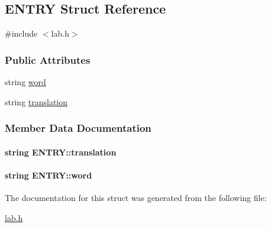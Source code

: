 \hypertarget{structENTRY}{\subsection{E\+N\+T\+R\+Y Struct Reference}
\label{structENTRY}
}


{\ttfamily \#include $<$lab.\+h$>$}

\subsubsection*{Public Attributes}
\begin{DoxyCompactItemize}
\item 
string \hyperlink{structENTRY_a7dfcf0a0b27dc7cecf80565a615d6233}{word}
\item 
string \hyperlink{structENTRY_aeffa74a793268864bbbdf6a3645bf36a}{translation}
\end{DoxyCompactItemize}


\subsubsection{Member Data Documentation}
\hypertarget{structENTRY_aeffa74a793268864bbbdf6a3645bf36a}{
\paragraph[{translation}]{\setlength{\rightskip}{0pt plus 5cm}string E\+N\+T\+R\+Y\+::translation}}\label{structENTRY_aeffa74a793268864bbbdf6a3645bf36a}
\hypertarget{structENTRY_a7dfcf0a0b27dc7cecf80565a615d6233}{
\paragraph[{word}]{\setlength{\rightskip}{0pt plus 5cm}string E\+N\+T\+R\+Y\+::word}}\label{structENTRY_a7dfcf0a0b27dc7cecf80565a615d6233}


The documentation for this struct was generated from the following file\+:\begin{DoxyCompactItemize}
\item 
\hyperlink{lab_8h}{lab.\+h}\end{DoxyCompactItemize}
